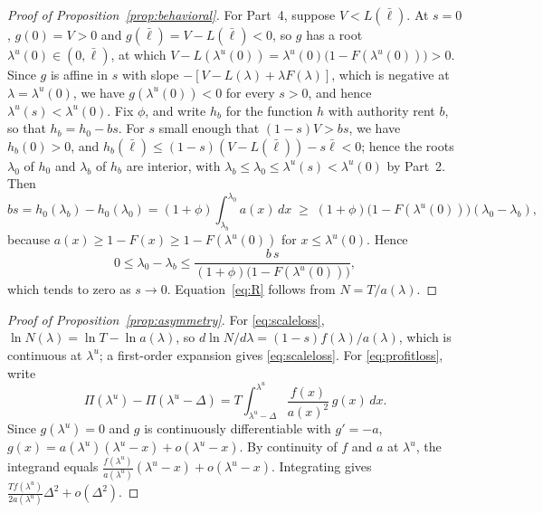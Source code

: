 \documentclass[11pt,a4paper]{article}
\theoremstyle{plain}
\newcommand{\lbar}{\bar{\ell}}
\begin{document}
\begin{proof}[Proof of Proposition~\ref{prop:behavioral}]
For Part~4, suppose $V < L(\lbar)$. At $s = 0$, $g(0) = V > 0$ and $g(\lbar) = V - L(\lbar) < 0$, so $g$ has a root $\lambda^u(0) \in (0, \lbar)$, at which $V - L(\lambda^u(0)) = \lambda^u(0)\big(1 - F(\lambda^u(0))\big) > 0$. Since $g$ is affine in $s$ with slope $-[V - L(\lambda) + \lambda F(\lambda)]$, which is negative at $\lambda = \lambda^u(0)$, we have $g(\lambda^u(0)) < 0$ for every $s > 0$, and hence $\lambda^u(s) < \lambda^u(0)$. Fix $\phi$, and write $h_b$ for the function $h$ with authority rent $b$, so that $h_b = h_0 - bs$. For $s$ small enough that $(1-s)V > bs$, we have $h_b(0) > 0$, and $h_b(\lbar) \le (1-s)(V - L(\lbar)) - s\lbar < 0$; hence the roots $\lambda_0$ of $h_0$ and $\lambda_b$ of $h_b$ are interior, with $\lambda_b \le \lambda_0 \le \lambda^u(s) < \lambda^u(0)$ by Part~2. Then
\[
  bs = h_0(\lambda_b) - h_0(\lambda_0) = (1+\phi) \int_{\lambda_b}^{\lambda_0} a(x) \, dx \;\ge\; (1+\phi)\big(1 - F(\lambda^u(0))\big)(\lambda_0 - \lambda_b),
\]
because $a(x) \ge 1 - F(x) \ge 1 - F(\lambda^u(0))$ for $x \le \lambda^u(0)$. Hence
\[
  0 \le \lambda_0 - \lambda_b \le \frac{b\,s}{(1+\phi)\big(1 - F(\lambda^u(0))\big)},
\]
which tends to zero as $s \to 0$. Equation~\eqref{eq:R} follows from $N = T/a(\lambda)$.
\end{proof}

\begin{proof}[Proof of Proposition~\ref{prop:asymmetry}]
For \eqref{eq:scaleloss}, $\ln N(\lambda) = \ln T - \ln a(\lambda)$, so $d \ln N/d\lambda = (1-s) f(\lambda)/a(\lambda)$, which is continuous at $\lambda^u$; a first-order expansion gives \eqref{eq:scaleloss}. For \eqref{eq:profitloss}, write
\[
  \Pi(\lambda^u) - \Pi(\lambda^u - \Delta) = T \int_{\lambda^u - \Delta}^{\lambda^u} \frac{f(x)}{a(x)^2} \, g(x) \, dx.
\]
Since $g(\lambda^u) = 0$ and $g$ is continuously differentiable with $g' = -a$, $g(x) = a(\lambda^u)(\lambda^u - x) + o(\lambda^u - x)$. By continuity of $f$ and $a$ at $\lambda^u$, the integrand equals $\frac{f(\lambda^u)}{a(\lambda^u)}(\lambda^u - x) + o(\lambda^u - x)$. Integrating gives $\frac{T f(\lambda^u)}{2a(\lambda^u)}\Delta^2 + o(\Delta^2)$.
\end{proof}
\end{document}
